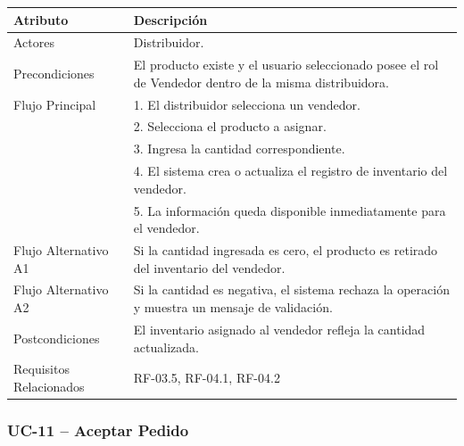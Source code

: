 \documentclass[12pt,a4paper]{report}
\begin{document}
\begin{longtable}{|p{4cm}|p{10cm}|}
\hline
\textbf{Atributo} & \textbf{Descripción} \\ \hline
Actores & Distribuidor. \\ \hline
Precondiciones & El producto existe y el usuario seleccionado posee el rol de Vendedor dentro de la misma distribuidora. \\ \hline
Flujo Principal &
1. El distribuidor selecciona un vendedor.\\
& 2. Selecciona el producto a asignar.\\
& 3. Ingresa la cantidad correspondiente.\\
& 4. El sistema crea o actualiza el registro de inventario del vendedor.\\
& 5. La información queda disponible inmediatamente para el vendedor. \\ \hline
Flujo Alternativo A1 & Si la cantidad ingresada es cero, el producto es retirado del inventario del vendedor. \\ \hline
Flujo Alternativo A2 & Si la cantidad es negativa, el sistema rechaza la operación y muestra un mensaje de validación. \\ \hline
Postcondiciones & El inventario asignado al vendedor refleja la cantidad actualizada. \\ \hline
Requisitos Relacionados & RF-03.5, RF-04.1, RF-04.2 \\ \hline
\end{longtable}
\subsubsection{UC-11 -- Aceptar Pedido}
\end{document}
